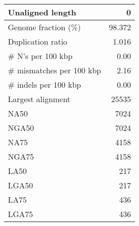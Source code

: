 \documentclass[12pt,a4paper]{article}
\begin{document}
\begin{table}[ht]
\begin{center}
\begin{tabular}{|l*{1}{|r}|}
Unaligned length & 0 \\ \hline
Genome fraction (\%) & 98.372 \\ \hline
Duplication ratio & 1.016 \\ \hline
\# N's per 100 kbp & 0.00 \\ \hline
\# mismatches per 100 kbp & 2.16 \\ \hline
\# indels per 100 kbp & 0.00 \\ \hline
Largest alignment & 25535 \\ \hline
NA50 & 7024 \\ \hline
NGA50 & 7024 \\ \hline
NA75 & 4158 \\ \hline
NGA75 & 4158 \\ \hline
LA50 & 217 \\ \hline
LGA50 & 217 \\ \hline
LA75 & 436 \\ \hline
LGA75 & 436 \\ \hline
\end{tabular}
\end{center}
\end{table}
\end{document}
